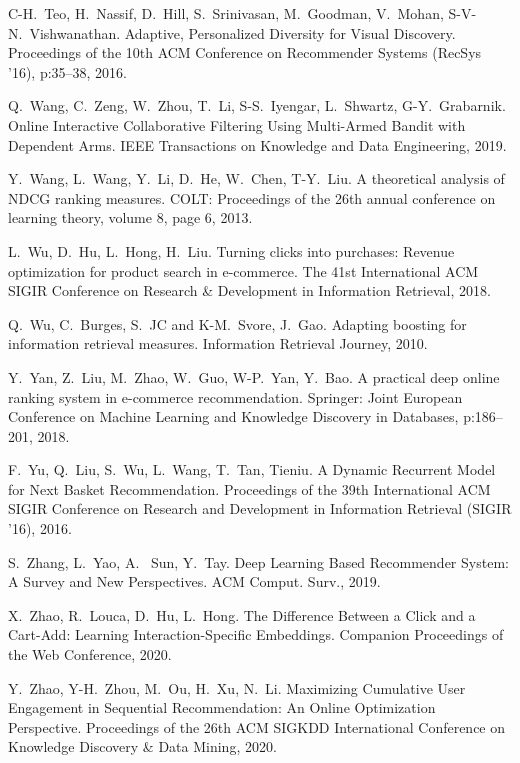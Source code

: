 \documentclass[11pt, dvipdfmx]{article}
\begin{document}
\begin{thebibliography}{10}
\begin{small}
C-H.~Teo, H.~Nassif, D.~Hill, S.~Srinivasan, M.~Goodman, V.~Mohan, S-V-N.~Vishwanathan.
\newblock Adaptive, Personalized Diversity for Visual Discovery.
\newblock Proceedings of the 10th ACM Conference on Recommender Systems (RecSys '16), p:35–38, 2016.

 Q.~Wang, C.~Zeng, W.~Zhou, T.~Li, S-S.~Iyengar, L.~Shwartz, G-Y.~Grabarnik.
\newblock Online Interactive Collaborative Filtering Using Multi-Armed Bandit with Dependent Arms.
\newblock IEEE Transactions on Knowledge and Data Engineering, 2019.

 Y.~Wang, L.~Wang, Y.~Li, D.~He, W.~Chen, T-Y.~Liu.
\newblock A theoretical analysis of NDCG ranking measures.
\newblock COLT: Proceedings of the 26th annual conference on learning theory, volume 8, page 6, 2013.

 L.~Wu, D.~Hu, L.~Hong, H.~Liu. \newblock Turning clicks into purchases: Revenue optimization for product search in e-commerce. \newblock The 41st International ACM SIGIR Conference on Research \& Development in Information Retrieval, 2018.

 Q.~Wu, C.~Burges, S.~JC and K-M.~Svore, J.~Gao.
\newblock Adapting boosting for information retrieval measures.
\newblock Information Retrieval Journey, 2010.

 Y.~Yan, Z.~Liu, M.~Zhao, W.~Guo, W-P.~Yan, Y.~Bao.
\newblock A practical deep online ranking system in e-commerce recommendation.
\newblock Springer: Joint European Conference on Machine Learning and Knowledge Discovery in Databases, p:186--201, 2018.

 F.~Yu, Q.~Liu, S.~Wu, L.~Wang, T.~Tan, Tieniu.
\newblock A Dynamic Recurrent Model for Next Basket Recommendation.
\newblock Proceedings of the 39th International ACM SIGIR Conference on Research and Development in Information Retrieval (SIGIR ’16), 2016.

 S.~Zhang, L.~Yao, A.~ Sun, Y.~Tay.
\newblock Deep Learning Based Recommender System: A Survey and New Perspectives.
\newblock ACM Comput. Surv., 2019.

 X.~Zhao, R.~Louca, D.~Hu, L.~Hong. \newblock The Difference Between a Click and a Cart-Add: Learning Interaction-Specific Embeddings. \newblock Companion Proceedings of the Web Conference, 2020.

 Y.~Zhao, Y-H.~Zhou, M.~Ou, H.~Xu, N.~Li. \newblock Maximizing Cumulative User Engagement in Sequential Recommendation: An Online Optimization Perspective. \newblock Proceedings of the 26th ACM SIGKDD International Conference on Knowledge Discovery \& Data Mining, 2020. 

\end{small}
\end{thebibliography}
\end{document}
